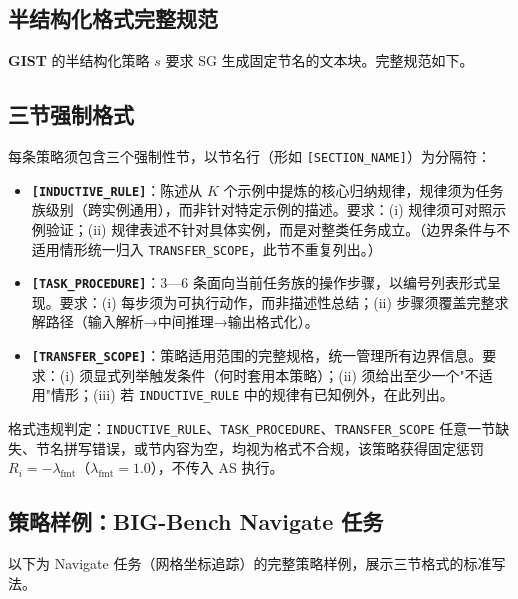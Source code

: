 \documentclass[11pt]{article}
\newcommand{\gist}{\textbf{GIST}}
\newcommand{\mist}{\textbf{GIST}}  %
\newcommand{\sg}{\textnormal{\textsc{SG}}}
\newcommand{\as}{\textnormal{\textsc{AS}}}
\begin{document}
\subsection{半结构化格式完整规范}
\label{app:schema_spec}

\mist{} 的半结构化策略 $s$ 要求 \sg{} 生成固定节名的文本块。完整规范如下。

\subsection{三节强制格式}

每条策略须包含三个强制性节，以节名行（形如 \texttt{[SECTION\_NAME]}）为分隔符：

\begin{itemize}[leftmargin=*, itemsep=2pt]
  \item \textbf{\texttt{[INDUCTIVE\_RULE]}}：陈述从 $K$ 个示例中提炼的核心归纳规律，规律须为任务族级别（跨实例通用），而非针对特定示例的描述。要求：(i) 规律须可对照示例验证；(ii) 规律表述不针对具体实例，而是对整类任务成立。（边界条件与不适用情形统一归入 \texttt{TRANSFER\_SCOPE}，此节不重复列出。）
  \item \textbf{\texttt{[TASK\_PROCEDURE]}}：3—6 条面向当前任务族的操作步骤，以编号列表形式呈现。要求：(i) 每步须为可执行动作，而非描述性总结；(ii) 步骤须覆盖完整求解路径（输入解析→中间推理→输出格式化）。
  \item \textbf{\texttt{[TRANSFER\_SCOPE]}}：策略适用范围的完整规格，统一管理所有边界信息。要求：(i) 须显式列举触发条件（何时套用本策略）；(ii) 须给出至少一个"不适用"情形；(iii) 若 \texttt{INDUCTIVE\_RULE} 中的规律有已知例外，在此列出。
\end{itemize}

格式违规判定：\texttt{INDUCTIVE\_RULE}、\texttt{TASK\_PROCEDURE}、\texttt{TRANSFER\_SCOPE} 任意一节缺失、节名拼写错误，或节内容为空，均视为格式不合规，该策略获得固定惩罚 $R_i = -\lambda_\text{fmt}$（$\lambda_\text{fmt} = 1.0$），不传入 \as{} 执行。

\subsection{策略样例：BIG-Bench Navigate 任务}

以下为 Navigate 任务（网格坐标追踪）的完整策略样例，展示三节格式的标准写法。
\end{document}
